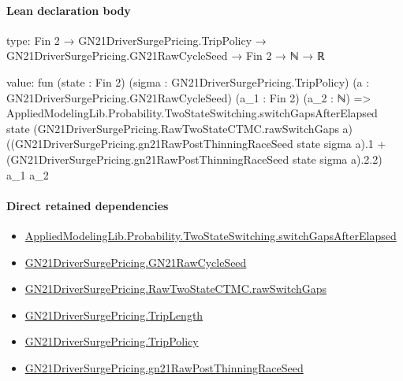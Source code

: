 \documentclass[10pt]{article}
\begin{document}
\paragraph{Lean declaration body}
\begin{ReviewVerbatim}
type:
Fin 2 → GN21DriverSurgePricing.TripPolicy → GN21DriverSurgePricing.GN21RawCycleSeed → Fin 2 → ℕ → ℝ

value:
fun (state : Fin 2) (sigma : GN21DriverSurgePricing.TripPolicy) (a : GN21DriverSurgePricing.GN21RawCycleSeed)
    (a_1 : Fin 2) (a_2 : ℕ) =>
  AppliedModelingLib.Probability.TwoStateSwitching.switchGapsAfterElapsed state
    (GN21DriverSurgePricing.RawTwoStateCTMC.rawSwitchGaps a)
    ((GN21DriverSurgePricing.gn21RawPostThinningRaceSeed state sigma a).1 +
      (GN21DriverSurgePricing.gn21RawPostThinningRaceSeed state sigma a).2.2)
    a_1 a_2
\end{ReviewVerbatim}

\paragraph{Direct retained dependencies}
\begin{itemize}\raggedright
\item \hyperlink{governing-declaration-3329b372388ba2bd}{Applied\allowbreak{}Modeling\allowbreak{}Lib.\allowbreak{}Probability.\allowbreak{}Two\allowbreak{}State\allowbreak{}Switching.\allowbreak{}switch\allowbreak{}Gaps\allowbreak{}After\allowbreak{}Elapsed}
\item \hyperlink{governing-declaration-228de34d5811f602}{GN21\allowbreak{}Driver\allowbreak{}Surge\allowbreak{}Pricing.\allowbreak{}GN21\allowbreak{}Raw\allowbreak{}Cycle\allowbreak{}Seed}
\item \hyperlink{governing-declaration-b675074221875cdb}{GN21\allowbreak{}Driver\allowbreak{}Surge\allowbreak{}Pricing.\allowbreak{}Raw\allowbreak{}Two\allowbreak{}State\allowbreak{}CTMC.\allowbreak{}raw\allowbreak{}Switch\allowbreak{}Gaps}
\item \hyperlink{governing-declaration-a616c143f22cf2bc}{GN21\allowbreak{}Driver\allowbreak{}Surge\allowbreak{}Pricing.\allowbreak{}Trip\allowbreak{}Length}
\item \hyperlink{governing-declaration-4312ad4cb899871f}{GN21\allowbreak{}Driver\allowbreak{}Surge\allowbreak{}Pricing.\allowbreak{}Trip\allowbreak{}Policy}
\item \hyperlink{governing-declaration-78b3ce688d2ea655}{GN21\allowbreak{}Driver\allowbreak{}Surge\allowbreak{}Pricing.\allowbreak{}gn21\allowbreak{}Raw\allowbreak{}Post\allowbreak{}Thinning\allowbreak{}Race\allowbreak{}Seed}
\end{itemize}
\hypertarget{governing-declaration-786802d67553a605}{}
\end{document}

